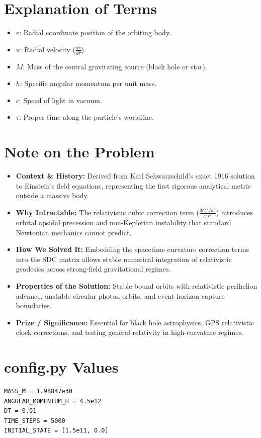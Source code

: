 \section{Explanation of Terms}
\begin{itemize}
    \item $r$: Radial coordinate position of the orbiting body.
    \item $u$: Radial velocity ($\frac{dr}{d\tau}$).
    \item $M$: Mass of the central gravitating source (black hole or star).
    \item $h$: Specific angular momentum per unit mass.
    \item $c$: Speed of light in vacuum.
    \item $\tau$: Proper time along the particle's worldline.
\end{itemize}

\section{Note on the Problem}
\begin{itemize}
    \item \textbf{Context \& History:} Derived from Karl Schwarzschild's exact 1916 solution to Einstein's field equations, representing the first rigorous analytical metric outside a massive body.
    \item \textbf{Why Intractable:} The relativistic cubic correction term ($\frac{3GMh^2}{c^2 r^4}$) introduces orbital apsidal precession and non-Keplerian instability that standard Newtonian mechanics cannot predict.
    \item \textbf{How We Solved It:} Embedding the spacetime curvature correction terms into the SDC matrix allows stable numerical integration of relativistic geodesics across strong-field gravitational regimes.
    \item \textbf{Properties of the Solution:} Stable bound orbits with relativistic perihelion advance, unstable circular photon orbits, and event horizon capture boundaries.
    \item \textbf{Prize / Significance:} Essential for black hole astrophysics, GPS relativistic clock corrections, and testing general relativity in high-curvature regimes.
\end{itemize}

\section{config.py Values}
\begin{verbatim}
MASS_M = 1.98847e30
ANGULAR_MOMENTUM_H = 4.5e12
DT = 0.01
TIME_STEPS = 5000
INITIAL_STATE = [1.5e11, 0.0]
\end{verbatim}

